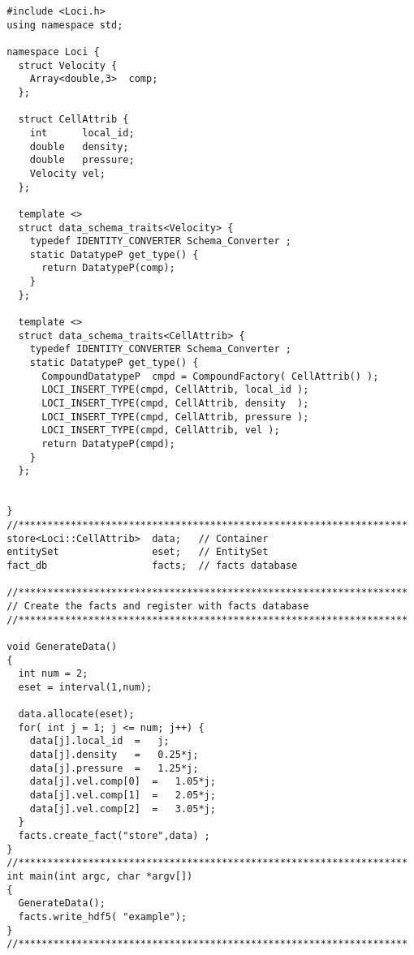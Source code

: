 \begin{verbatim}
 #include <Loci.h>
 using namespace std;

 namespace Loci {
   struct Velocity {
     Array<double,3>  comp;
   };

   struct CellAttrib {
     int      local_id;
     double   density;
     double   pressure;
     Velocity vel;
   };

   template <>
   struct data_schema_traits<Velocity> {
     typedef IDENTITY_CONVERTER Schema_Converter ;
     static DatatypeP get_type() {
       return DatatypeP(comp);
     }
   };

   template <>
   struct data_schema_traits<CellAttrib> {
     typedef IDENTITY_CONVERTER Schema_Converter ;
     static DatatypeP get_type() {
       CompoundDatatypeP  cmpd = CompoundFactory( CellAttrib() );
       LOCI_INSERT_TYPE(cmpd, CellAttrib, local_id );
       LOCI_INSERT_TYPE(cmpd, CellAttrib, density  );
       LOCI_INSERT_TYPE(cmpd, CellAttrib, pressure );
       LOCI_INSERT_TYPE(cmpd, CellAttrib, vel );
       return DatatypeP(cmpd);
     }
   };


 }
 //*******************************************************************
 store<Loci::CellAttrib>  data;   // Container
 entitySet                eset;   // EntitySet
 fact_db                  facts;  // facts database

 //*******************************************************************
 // Create the facts and register with facts database
 //*******************************************************************

 void GenerateData()
 {
   int num = 2;
   eset = interval(1,num);

   data.allocate(eset);
   for( int j = 1; j <= num; j++) {
     data[j].local_id  =   j;
     data[j].density   =   0.25*j;
     data[j].pressure  =   1.25*j;
     data[j].vel.comp[0]  =   1.05*j;
     data[j].vel.comp[1]  =   2.05*j;
     data[j].vel.comp[2]  =   3.05*j;
   }
   facts.create_fact("store",data) ;
 }
 //*******************************************************************
 int main(int argc, char *argv[])
 {
   GenerateData();
   facts.write_hdf5( "example");
 }
 //*******************************************************************
\end{verbatim}
